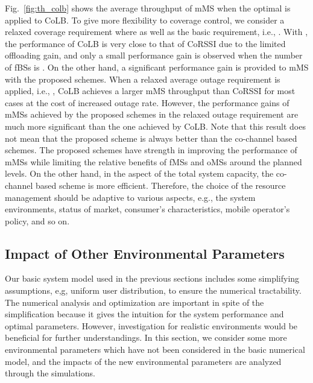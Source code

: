 \documentclass[journal]{IEEEtran}
\begin{document}
Fig.~\ref{fig:th_colb} shows the average throughput
of mMS when the optimal  is applied to CoLB.
To give more flexibility to coverage control, we consider
a relaxed coverage requirement where  as well as the basic
requirement, i.e., .
With , the performance of CoLB is very close to that of
CoRSSI due to the limited offloading gain,
and only a small performance gain is observed when the number of fBSs is .
On the other hand, a significant performance gain is provided to mMS
with the proposed schemes.
When a relaxed average outage requirement is applied, i.e., ,
CoLB achieves a larger mMS throughput than CoRSSI for most cases
at the cost of increased outage rate. However, the performance gains of mMSs
achieved by the proposed schemes in the relaxed outage requirement
are much more significant than the one achieved by CoLB.
Note that this result does not mean that the proposed scheme
is always better than the co-channel based schemes.
The proposed schemes have strength in improving
the performance of mMSs while limiting the relative
benefits of fMSs and oMSs around the planned levels.
On the other hand, in the aspect of the total system capacity,
the co-channel based scheme is more efficient.
Therefore, the choice of the resource management should
be adaptive to  various aspects, e.g.,
the system environments, status of market, consumer's characteristics,
mobile operator's policy, and so on.



\subsection{Impact of Other Environmental Parameters}
\label{sec:other}
Our basic system model used in the previous sections
includes some simplifying assumptions, e,g, uniform user distribution,
to ensure the numerical tractability.
The numerical analysis
and optimization are important in spite of the simplification
because it gives the intuition for the system performance
and optimal parameters.
However, investigation for realistic environments would be beneficial
for further understandings.
In this section, we consider some more environmental
parameters which have not been considered in the basic
numerical model,
and the impacts of the new environmental parameters
are analyzed through the simulations.
\end{document}
